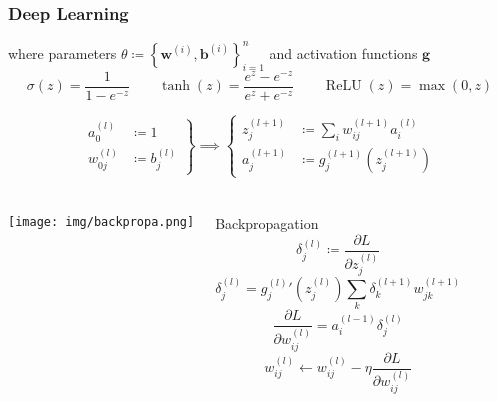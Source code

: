 \documentclass[UTF8,11pt,colorlinks,compress,openany]{beamer}%
\begin{document}
\begin{frame}\frametitle{Deep Learning}
\setlength\abovedisplayskip{0pt}
\setlength\belowdisplayskip{0pt}
	\begin{center}
	\end{center}
	where parameters $\theta\coloneqq \left\{\mathbf{w}^{(i)},\mathbf{b}^{(i)}\right\}_{i=1}^n$ and activation functions $\mathbf{g}$
	\[\sigma(z)=\frac{1}{1-e^{-z}}\qquad \tanh(z)=\dfrac{e^z-e^{-z}}{e^z+e^{-z}}\qquad\operatorname{ReLU}(z)=\max(0,z)\]\vspace*{-5pt}
	\begin{block}{}
		\[
		\left.\begin{aligned}
		a_0^{(l)}&\coloneqq 1\\
		w_{0j}^{(l)}&\coloneqq b_j^{(l)}
		\end{aligned}\right\}\implies\left\{
		\begin{aligned}
		z_j^{(l+1)}&\coloneqq \sum\limits_i w_{ij}^{(l+1)}a_i^{(l)}\\
		a_j^{(l+1)}&\coloneqq g_j^{(l+1)}\left(z_j^{(l+1)}\right)
		\end{aligned}\right.
		\]
	\end{block}
\end{frame}

\begin{frame}\frametitle{}
	\begin{columns}
			\centering \texttt{[image: img/backpropa.png]}
			\begin{block}{Backpropagation}
				\[\delta_j^{(l)}\coloneqq \frac{\partial L}{\partial z_j^{(l)}}\]
				\[\delta_j^{(l)}={g_j^{(l)}}'\!\left(z_j^{(l)}\right)\sum_k\delta_k^{(l+1)}w_{jk}^{(l+1)}\]
				\[\frac{\partial L}{\partial w_{ij}^{(l)}}=a_i^{(l-1)}\delta_j^{(l)}\]
				\[w_{ij}^{(l)}\gets w_{ij}^{(l)}-\eta\frac{\partial L}{\partial w_{ij}^{(l)}}\]
			\end{block}
	\end{columns}
\end{frame}
\end{document}
